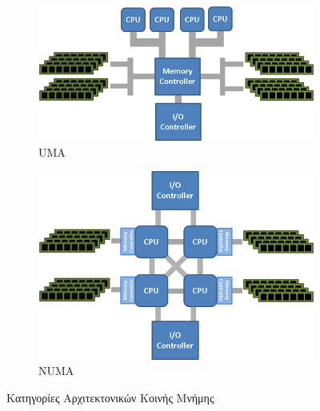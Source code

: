 \begin{figure}
    \centering
    \begin{subfigure}[b]{0.45\textwidth}
        \includegraphics[width=\textwidth]{./images/UMA.png}
        \caption{UMA}
    \end{subfigure}
    \quad %
    \begin{subfigure}[b]{0.45\textwidth}
        \includegraphics[width=\textwidth]{./images/NUMA.png}
        \caption{NUMA}
    \end{subfigure}
    \caption{Κατηγορίες Αρχιτεκτονικών Κοινής Μνήμης}
    \label{fig:shared_mem}
\end{figure}

